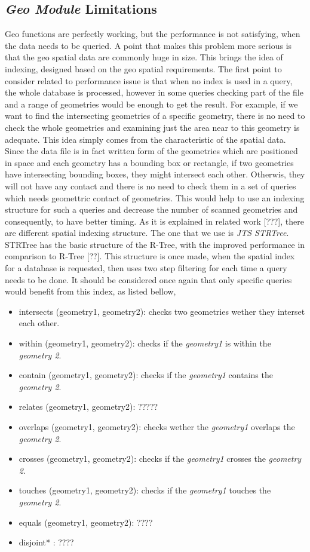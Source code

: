 \documentclass[a4paper,12pt]{article}
\begin{document}
\subsection{\textit{Geo Module} Limitations}
Geo functions are perfectly working, but the performance is not satisfying, when the data needs to be queried. A point that makes this problem more serious is that the geo spatial data are commonly huge in size. This brings the idea of indexing, designed based on the geo spatial requirements.
The first point to consider related to performance issue is that when no index is used in a query, the whole database is processed, however in some queries checking part of the file and a range of geometries would be enough to get the result. For example, if we want to find the intersecting geometries of a specific geometry, there is no need to check the whole geometries and examining just the area near to this geometry is adequate. This idea simply comes from the characteristic of the spatial data. Since the data file is in fact written form of the geometries which are positioned in space and each geometry has a bounding box or rectangle, if two geometries have intersecting bounding boxes, they might intersect each other. Otherwis, they will not have any contact and there is no need to check them in a set of queries which needs geomettric contact of geometries.  
This would help to use an indexing structure for such a queries and decrease the number of scanned geometries and consequently, to have better timing.
As it is explained in related work [???], there are different spatial indexing structure. The one that we use is \textit{JTS STRTree}. STRTree has the basic structure of the R-Tree, with the improved performance in comparison to R-Tree [??]. This structure is once made, when the spatial index for a database is requested, then uses two step filtering for each time a query needs to be done. It should be considered once again that only specific queries would benefit from this index, as listed bellow,

\begin{itemize}
\item intersects (geometry1, geometry2): checks two geometries wether they interset each other.
\item within (geometry1, geometry2): checks if the \textit{geometry1} is within the \textit{geometry 2}.
\item contain (geometry1, geometry2): checks if the \textit{geometry1} contains the \textit{geometry 2}.
\item relates (geometry1, geometry2): ????? 
\item overlaps (geometry1, geometry2): checks wether the \textit{geometry1} overlaps the \textit{geometry 2}.
\item crosses (geometry1, geometry2): checks if the \textit{geometry1} crosses the \textit{geometry 2}.
\item touches (geometry1, geometry2): checks if the \textit{geometry1} touches the \textit{geometry 2}.
\item equals (geometry1, geometry2): ????
\item disjoint* : ????
\end{itemize}
\end{document}
